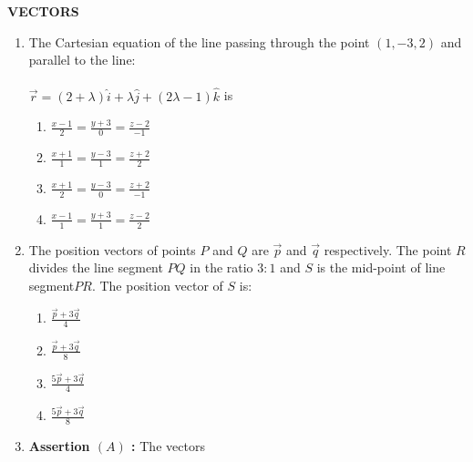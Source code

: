 \documentclass[12pt,-letter paper]{article}
\providecommand{\brak}[1]{\ensuremath{\left(#1\right)}}
\begin{document}
                      \begin{center}                                               \textbf{VECTORS}                                                    \end{center}                                                            \begin{enumerate}
        \item
            The Cartesian equation of the line passing through the point $\brak{1,-3,2}$ and parallel to the line:  \\ \\
  $\overrightarrow{r} = $\brak{2+\lambda}$ \hat{i} + \lambda \hat{j}
+ $\brak{2\lambda-1}$ \hat{k}$ is
      \begin{enumerate}[label={$\brak{\Alph*}$}]                            \item  $ \frac{x-1}{2} = \frac{y+3}{0} = \frac{z-2}{-1}$                \item  $\frac{x+1}{1} = \frac{y-3}{1} = \frac{z+2}{2}$                  \item  $\frac{x+1}{2} = \frac{y-3}{0} = \frac{z+2}{-1}$                 \item  $\frac{x-1}{1} = \frac{y+3}{1} = \frac{z-2}{2}$ 
      \end{enumerate}                                                             \item                                                           The position vectors of points $P$ and $ Q $ are $\overrightarrow{p}$  and $\overrightarrow{q}$ respectively. The point $ R $ divides the line segment  $ PQ $ in the ratio $ 3:1 $  and $S$ is the mid-point of  line segment$ PR $. The position vector of $ S $ is:                                     
                \begin{enumerate}[label={$\brak{\Alph*}$}]                      \item $\frac{\overrightarrow {p} + 3\overrightarrow {q}}{4}$            \item $\frac{\overrightarrow{p} + 3\overrightarrow{q}}{8}$
        \item $\frac{5\overrightarrow{p} + 3\overrightarrow{q}}{4}$
        \item $\frac{5\overrightarrow{p} + 3\overrightarrow{q}}{8}$
    \end{enumerate}                                                          \item
    \textbf{Assertion $\brak{A}$ :} The vectors \\ \\

\end{enumerate}
\end{document}
